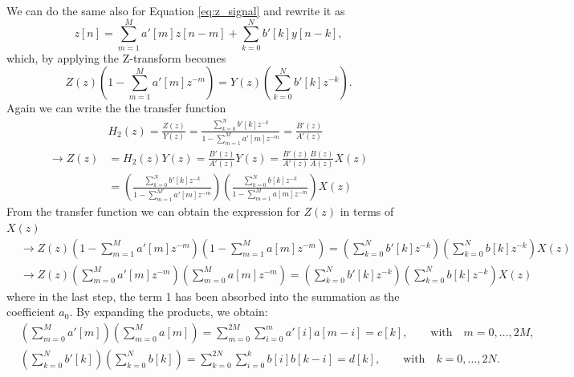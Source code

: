 We can do the same also for Equation \ref{eq:z_signal} and rewrite it as 
\begin{equation}\label{eq:z_signal1}
    z[n] = \sum_{m=1}^{M} a'[m]z[n-m] + \sum_{k=0}^{N} b'[k] y[n-k],
\end{equation}
which, by applying the Z-transform becomes
\begin{equation}\label{eq:z_signal_transform}
    Z(z)\left(1 - \sum_{m=1}^{M} a'[m] z^{-m} \right) = Y(z) \left( \sum_{k=0}^{N} b'[k] z^{-k} \right).
\end{equation}
Again we can write the the transfer function
\begin{align}
    &H_2(z) = \frac{Z(z)}{Y(z)} = \frac{\sum_{k=0}^{N} b'[k] z^{-k}}{1 - \sum_{m=1}^{M} a'[m] z^{-m}} = \frac{B'(z)}{A'(z)} \\
    \rightarrow Z(z) &= H_2(z)Y(z) = \frac{B'(z)}{A'(z)}Y(z) = \frac{B'(z)}{A'(z)} \frac{B(z)}{A(z)} X(z)\\ \label{eq:transfer2}
    &= \left( \frac{\sum_{k=0}^{N} b'[k] z^{-k}}{1 - \sum_{m=1}^{M'} a'[m] z^{-m}} \right) \left( \frac{\sum_{k=0}^{N} b[k] z^{-k}}{1 - \sum_{m=1}^{M} a[m] z^{-m}} \right) X(z)
\end{align}
From the transfer function we can obtain the expression for $Z(z)$ in terms of $X(z)$ 
\begin{align}
    & \rightarrow Z(z) \left(1 - \sum_{m=1}^{M} a'[m] z^{-m} \right) \left(1 - \sum_{m=1}^{M} a[m] z^{-m} \right) = \left( \sum_{k=0}^{N} b'[k] z^{-k} \right) \left( \sum_{k=0}^{N} b[k] z^{-k} \right) X(z) \\
    & \rightarrow Z(z) \left( \sum_{m=0}^{M} a'[m] z^{-m} \right) \left( \sum_{m=0}^{M} a[m] z^{-m} \right) = \left( \sum_{k=0}^{N} b'[k] z^{-k} \right) \left( \sum_{k=0}^{N} b[k] z^{-k} \right) X(z) \label{eq:Zz}
\end{align}
where in the last step, the term 1 has been absorbed into the summation as the coefficient $a_0$. By expanding the products, we obtain:
\begin{align}
    & \left( \sum_{m=0}^{M} a'[m] \right) \left( \sum_{m=0}^{M} a[m] \right) = \sum_{m=0}^{2M}\sum_{i=0}^{m} a'[i] a[m - i] = c[k], \quad\quad \text{with}\quad m = 0, \dots, 2M, \label{eq:ck} \\
    & \left( \sum_{k=0}^{N} b'[k] \right) \left( \sum_{k=0}^{N} b[k] \right) = \sum_{k=0}^{2N} \sum_{i=0}^{k} b[i] b[k-i] = d[k], \quad\quad \text{with}\quad k = 0, \dots, 2N. \label{eq:dk}
\end{align}

